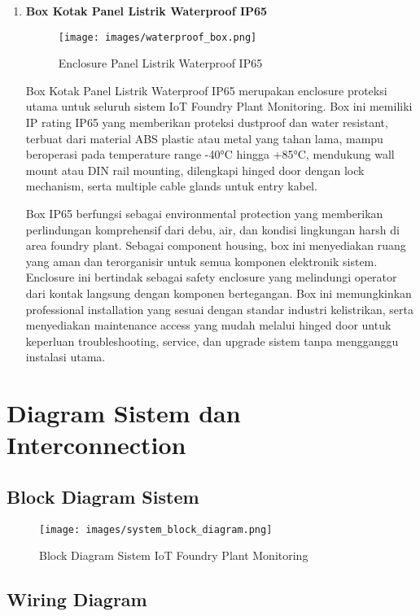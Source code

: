 \documentclass[12pt,a4paper]{article}
\begin{document}
\begin{enumerate}[leftmargin=0pt,itemsep=1em]
\item \textbf{Box Kotak Panel Listrik Waterproof IP65}

\begin{figure}[H]
\centering
\texttt{[image: images/waterproof\_box.png]}
\caption{Enclosure Panel Listrik Waterproof IP65}
\label{fig:waterproof_box}
\end{figure}

Box Kotak Panel Listrik Waterproof IP65 merupakan enclosure proteksi utama untuk seluruh sistem IoT Foundry Plant Monitoring. Box ini memiliki IP rating IP65 yang memberikan proteksi dustproof dan water resistant, terbuat dari material ABS plastic atau metal yang tahan lama, mampu beroperasi pada temperature range -40°C hingga +85°C, mendukung wall mount atau DIN rail mounting, dilengkapi hinged door dengan lock mechanism, serta multiple cable glands untuk entry kabel.

Box IP65 berfungsi sebagai environmental protection yang memberikan perlindungan komprehensif dari debu, air, dan kondisi lingkungan harsh di area foundry plant. Sebagai component housing, box ini menyediakan ruang yang aman dan terorganisir untuk semua komponen elektronik sistem. Enclosure ini bertindak sebagai safety enclosure yang melindungi operator dari kontak langsung dengan komponen bertegangan. Box ini memungkinkan professional installation yang sesuai dengan standar industri kelistrikan, serta menyediakan maintenance access yang mudah melalui hinged door untuk keperluan troubleshooting, service, dan upgrade sistem tanpa mengganggu instalasi utama.

\end{enumerate}

\section{Diagram Sistem dan Interconnection}

\subsection{Block Diagram Sistem}

\begin{figure}[H]
\centering
\texttt{[image: images/system\_block\_diagram.png]}
\caption{Block Diagram Sistem IoT Foundry Plant Monitoring}
\label{fig:system_block}
\end{figure}

\subsection{Wiring Diagram}
\end{document}
